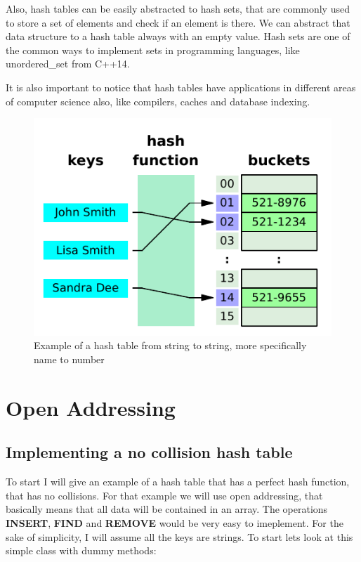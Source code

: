 Also, hash tables can be easily abstracted to hash sets, that are commonly used to store a set of elements and check if an element is there. We can abstract that data structure to a hash table always with an empty value. Hash sets are one of the common ways to implement sets in programming languages, like unordered\_set from C++14.

It is also important to notice that hash tables have applications in different areas of computer science also, like compilers, caches and database indexing.


\begin{figure}[h!]
  \centering
  \includegraphics[width=12cm]{figuras/hash-table.pdf}
  \caption{Example of a hash table from string to string, more specifically name to number}
\end{figure}

\newpage

\section{Open Addressing}

\subsection{Implementing a no collision hash table}

To start I will give an example of a hash table that has a perfect hash function, that has no collisions. For that example we will use open addressing, that basically means that all data will be contained in an array. The operations \textbf{INSERT}, \textbf{FIND} and \textbf{REMOVE} would be very easy to imeplement. For the sake of simplicity, I will assume all the keys are strings. To start lets look at this simple class with dummy methods:

